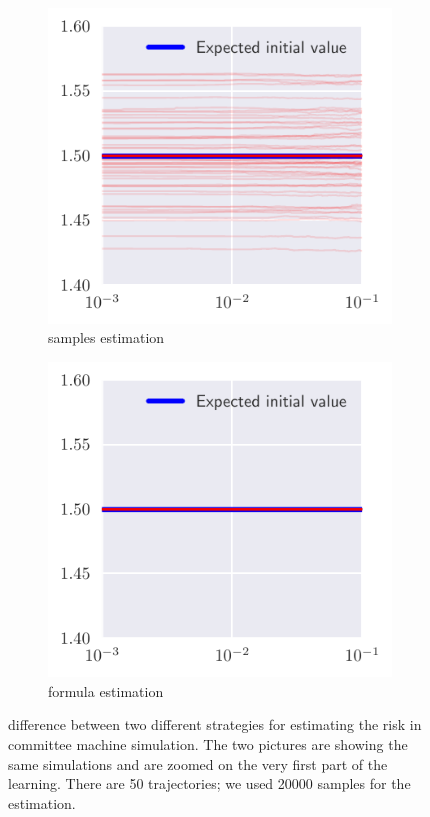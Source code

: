 \begin{figure}
  \centering
  \begin{subfigure}{0.495\textwidth}
    \includegraphics[width=1.\textwidth]{figures/risk_samples.pdf}
    \caption{samples estimation}
  \end{subfigure}
  \begin{subfigure}{0.495\textwidth}
    \includegraphics[width=1.\textwidth]{figures/risk_macroscopic.pdf}
    \caption{formula estimation}
  \end{subfigure}

  \caption{
    difference between two different strategies for estimating the risk in committee machine simulation.
    The two pictures are showing the same simulations and are zoomed on the very first part of the learning.
    There are 50 trajectories; we used 20000 samples for the estimation.
  }
  \label{fig:sampling_formula_risk}
\end{figure}

